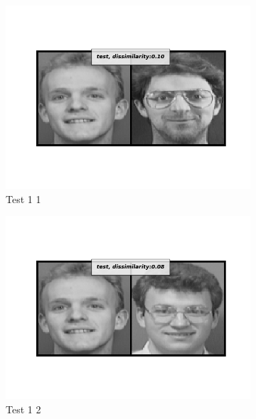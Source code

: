 \documentclass[12pt]{article}
\begin{document}
\begin{figure}[htbp]
\begin{subfigure}[t]{0.48\textwidth}
        \includegraphics[scale=0.5,trim={1in 1in 1in 1in},clip]{./Homework3/output/siamese/test_1_1.png}
        \caption{Test 1 1}
    \label{hw3p3g}
    \end{subfigure}
    \begin{subfigure}[t]{0.48\textwidth}
        \centering
        \includegraphics[scale=0.5,trim={1in 1in 1in 1in},clip]{./Homework3/output/siamese/test_1_2.png}
        \caption{Test 1 2}
    \label{hw3p3h}
    \end{subfigure}
    \begin{subfigure}[t]{0.48\textwidth}
        \centering

\end{subfigure}
\end{figure}
\end{document}

